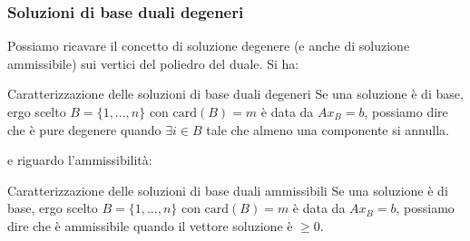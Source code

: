 \documentclass[a4paper,11pt]{article}
\begin{document}
\subsubsection{Soluzioni di base duali degeneri}
Possiamo ricavare il concetto di soluzione degenere (e anche di soluzione ammissibile) sui vertici del poliedro del duale. Si ha:

\begin{theorem}{Caratterizzazione delle soluzioni di base duali degeneri}
	Se una soluzione è di base, ergo scelto $B = \{ 1, ..., n \}$ con $\mathrm{card}(B) = m$ è data da $Ax_B = b$, possiamo dire che è pure degenere quando $\exists i \in B$ tale che almeno una componente si annulla. 
\end{theorem}
e riguardo l'ammissibilità:
\begin{theorem}{Caratterizzazione delle soluzioni di base duali ammissibili}
	Se una soluzione è di base, ergo scelto $B = \{ 1, ..., n \}$ con $\mathrm{card}(B) = m$ è data da $Ax_B = b$, possiamo dire che è ammissibile quando il vettore soluzione è $\geq 0$. 
\end{theorem}
\end{document}
